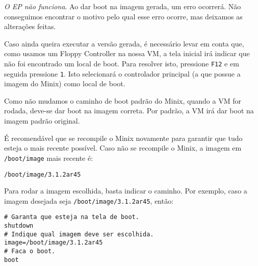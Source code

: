 \documentclass{amsart}
\theoremstyle{plain}
\newcommand{\code}[1]{\lstinline[mathescape=true]{#1}}
\begin{document}
\emph{O EP não funciona}. Ao dar boot na imagem gerada, um erro ocorrerá. Não conseguimos encontrar o motivo pelo qual esse erro ocorre, mas deixamos as alterações feitas.

Caso ainda queira executar a versão gerada, é necessário levar em conta que, como usamos um Floppy Controller na nossa VM, a tela inicial irá indicar que não foi encontrado um
local de boot. Para resolver isto, pressione \code{F12} e em seguida pressione \code{1}. Isto
selecionará o controlador principal (a que possue a imagem do Minix) como local de boot.

Como não mudamos o caminho de boot padrão do Minix, quando a VM for rodada, deve-se dar boot na
imagem correta. Por padrão, a VM irá dar boot na imagem padrão original.

É recomendável que se recompile o Minix novamente para garantir que tudo esteja o mais recente
possível. Caso não se recompile o Minix, a imagem em \code{/boot/image} mais recente é:

\begin{lstlisting}[frame=leftline,mathescape=true,style=nonumbers]
/boot/image/3.1.2ar45
\end{lstlisting}

Para rodar a imagem escolhida, basta indicar o caminho. Por exemplo, caso a imagem desejada seja
\code{/boot/image/3.1.2ar45}, então:

\begin{lstlisting}[frame=leftline,mathescape=true,style=nonumbers]
# Garanta que esteja na tela de boot.
shutdown
# Indique qual imagem deve ser escolhida.
image=/boot/image/3.1.2ar45
# Faca o boot.
boot
\end{lstlisting}
\end{document}
